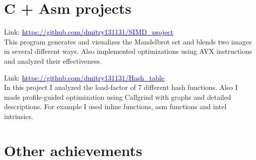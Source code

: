 \documentclass{cv}
\begin{document}
{{\begin{minipage}[t][25.7cm][t]{0.55\textwidth}
\section{\textbf{\huge C + Asm projects}}
\vspace{0.3cm}
Link: \href{https://github.com/dmitry131131/SIMD_project}{\textcolor{blue}{\underline{https://github.com/dmitry131131/SIMD\_project}}} \\

This program generates and visualizes the Mandelbrot set and blends two images in several different ways. Also implemented optimizations using AVX instructions and analyzed their effectiveness.

Link: \href{https://github.com/dmitry131131/Hash_table}{\textcolor{blue}{\underline{https://github.com/dmitry131131/Hash\_table}}} \\

In this project I analyzed the load-factor of 7 different hash functions. Also I made profile-guided optimization using Callgrind with graphs and detailed descriptions. For example I used inline functions, asm functions and intel intrinsics.

\section{\textbf{\huge Other achievements}}
\vspace{0.3cm}
\vspace{0.3cm}

\end{minipage}}}
\end{document}
